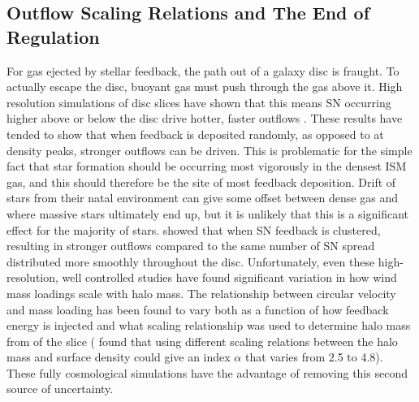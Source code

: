 \subsection{Outflow Scaling Relations and The End of Regulation}
For gas ejected by stellar feedback, the path out of a galaxy disc is fraught.
To actually escape the disc, buoyant gas must push through the gas above it.
High resolution simulations of disc slices have shown that this means SN
occurring higher above or below the disc drive hotter, faster outflows
\citep{vonGlasow2013,Sarkar2015}.  These results have tended to show that when
feedback is deposited randomly, as opposed to at density peaks, stronger
outflows can be driven.  This is problematic for the simple fact that star
formation should be occurring most vigorously in the densest ISM gas, and this
should therefore be the site of most feedback deposition.  Drift of stars from
their natal environment can give some offset between dense gas and where massive
stars ultimately end up, but it is unlikely that this is a significant effect
for the majority of stars.  \citet{Governato2010,vonGlasow2013,Christensen2016}
showed that when SN feedback is clustered, resulting in stronger outflows
compared to the same number of SN spread
distributed more smoothly throughout the disc.  Unfortunately, even these
high-resolution, well controlled studies have found significant variation in how
wind mass loadings scale with halo mass.  The relationship between circular
velocity and mass loading has been found to vary both as a function of how
feedback energy is injected \citep{vonGlasow2013} and what scaling relationship
was used to determine halo mass from of the slice (\citet{Creasey2013} found
that using different scaling relations between the halo mass and surface density
could give an index $\alpha$ that varies from 2.5 to 4.8).  These fully cosmological
simulations have the advantage of removing this second source of uncertainty.

